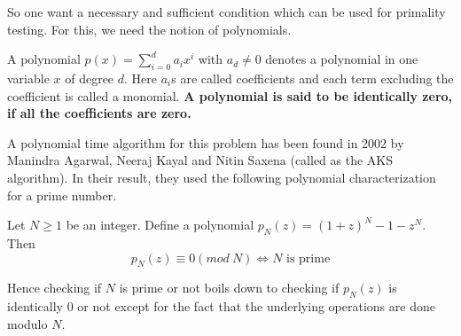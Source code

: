 So one want a necessary and sufficient condition which can be used for
primality testing. For this, we need the notion of polynomials.
\begin{definition}
	A polynomial $p(x) = \sum_{i=0}^d a_ix^i$ with $a_d \ne 0$ denotes a
	polynomial in one variable $x$ of degree $d$. Here $a_i$s are called
	coefficients and each term excluding the coefficient is called a
	monomial. \textbf{A polynomial is said to be identically zero, if all
	the coefficients are zero.}
\end{definition}

A polynomial time algorithm for this problem has been found in 2002 by
Manindra Agarwal, Neeraj Kayal and Nitin Saxena (called as the AKS algorithm). 
In their result, they used the following polynomial characterization for a
prime number.
\begin{theorem} Let $N \ge 1$ be
	an integer. Define a polynomial 
	$p_N(z) = (1+z)^N - 1 - z^N$. Then \[ p_N(z) \equiv 0 (mod~ N)
	\iff N \text{ is prime} \]
\end{theorem}

Hence checking if $N$ is prime or not boils down to checking if $p_N(z)$ is
identically $0$ or not except for the fact that the underlying operations are
done modulo $N$.

